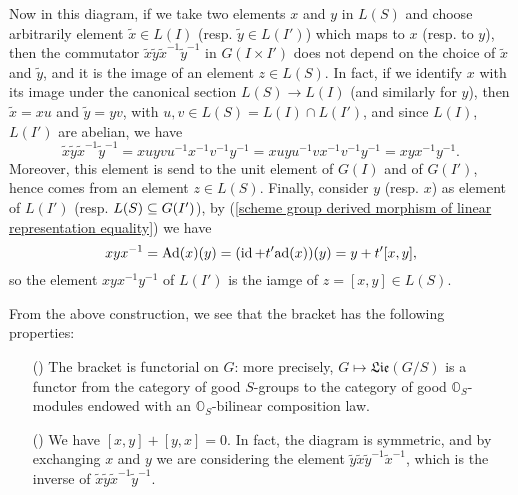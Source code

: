 \begin{remark}
Now in this diagram, if we take two elements $x$ and $y$ in $L(S)$ and choose arbitrarily element $\tilde{x}\in L(I)$ (resp. $\tilde{y}\in L(I')$) which maps to $x$ (resp. to $y$), then the commutator $\tilde{x}\tilde{y}\tilde{x}^{-1}\tilde{y}^{-1}$ in $G(I\times I')$ does not depend on the choice of $\tilde{x}$ and $\tilde{y}$, and it is the image of an element $z\in L(S)$. In fact, if we identify $x$ with its image under the canonical section $L(S)\to L(I)$ (and similarly for $y$), then $\tilde{x}=xu$ and $\tilde{y}=yv$, with $u,v\in L(S)=L(I)\cap L(I')$, and since $L(I)$, $L(I')$ are abelian, we have
\[\tilde{x}\tilde{y}\tilde{x}^{-1}\tilde{y}^{-1}=xuyvu^{-1}x^{-1}v^{-1}y^{-1}=xuyu^{-1}vx^{-1}v^{-1}y^{-1}=xyx^{-1}y^{-1}.\]
Moreover, this element is send to the unit element of $G(I)$ and of $G(I')$, hence comes from an element $z\in L(S)$. Finally, consider $y$ (resp. $x$) as element of $L(I')$ (resp. $L(S)\subseteq G(I')$), by (\ref{scheme group derived morphism of linear representation equality}) we have
\[xyx^{-1}=\mathrm{Ad}(x)(y)=(\operatorname{id}+t'\mathrm{ad}(x))(y)=y+t'[x,y],\]
so the element $xyx^{-1}y^{-1}$ of $L(I')$ is the iamge of $z=[x,y]\in L(S)$.\par
From the above construction, we see that the bracket has the following properties:
\begin{enumerate}
    \item[(\rmnum{1})] The bracket is functorial on $G$: more precisely, $G\mapsto\mathfrak{Lie}(G/S)$ is a functor from the category of good $S$-groups to the category of good $\mathbb{O}_S$-modules endowed with an $\mathbb{O}_S$-bilinear composition law.
    \item[(\rmnum{2})] We have $[x,y]+[y,x]=0$. In fact, the diagram is symmetric, and by exchanging $x$ and $y$ we are considering the element $\tilde{y}\tilde{x}\tilde{y}^{-1}\tilde{x}^{-1}$, which is the inverse of $\tilde{x}\tilde{y}\tilde{x}^{-1}\tilde{y}^{-1}$.
\end{enumerate}
\end{remark}


